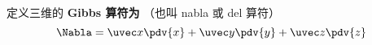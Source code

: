 

定义三维的 \textbf{Gibbs 算符为} （也叫 nabla 或 del 算符）
\begin{equation}
\Nabla = \uvec x \pdv{x} + \uvec y \pdv{y} + \uvec z \pdv{z}
\end{equation}
